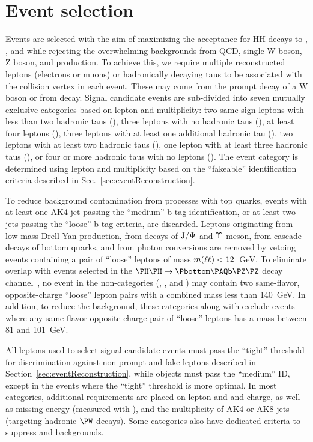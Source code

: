 \section{Event selection}
\label{sec:eventSelection}

Events are selected with the aim of maximizing the acceptance for HH decays to \WWWW, \WWtt, and
\tttt while rejecting the overwhelming backgrounds from QCD, single W
boson, Z boson, and \ttbar production.  To achieve this, we require multiple
reconstructed leptons \lep (electrons or muons) or hadronically decaying taus
\tauh to be associated with the collision vertex in each event.  These may come
from the prompt decay of a W boson or from \Pgt decay.  Signal candidate events
are sub-divided into seven mutually exclusive categories based on lepton and \tauh
multiplicity: two same-sign leptons with less than two hadronic taus (\llss),
three leptons with no hadronic taus (\lllnot), at least four leptons (\llll),
three leptons with at least one additional hadronic tau (\lllt), two
leptons with at least two hadronic taus (\lltt), one lepton with at least
three hadronic taus (\lttt), or four or more hadronic taus with no leptons (\noltttt).
The event category is determined using lepton and \tauh multiplicity based on the
``fakeable'' identification criteria described in Sec.~\ref{sec:eventReconstruction}.

To reduce background contamination from processes with top quarks, events with
at least one AK4 jet passing the ``medium'' b-tag identification, or at least two
jets passing the ``loose'' b-tag criteria, are discarded. 
Leptons originating from low-mass Drell-Yan production, from decays of $\textrm{J}/\Psi$ and $\Upsilon$ meson,
from cascade decays of bottom quarks, and from photon conversions
are removed by vetoing events containing a pair of ``loose'' leptons of mass $m(\ell\ell) < 12$~GeV.
To eliminate overlap with events selected in the $\HH \to \Pbottom\APbottom\PZ\PZ$ decay channel~\cite{HIG-20-004}, no event in the
non-\tauh categories (\llss, \lllnot, and \llll) may contain two same-flavor,
opposite-charge ``loose'' lepton pairs with a combined mass less than 140~GeV.
In addition, to reduce the \Zll background, these categories along with
\lltt exclude events where any same-flavor opposite-charge pair of ``loose''
leptons has a mass between 81 and 101~GeV.

All leptons used to select signal candidate events must pass the ``tight'' threshold
for discrimination against non-prompt and fake leptons described in
Section~\ref{sec:eventReconstruction}, while \tauh objects must pass the ``medium'' ID,
except in the \lllt events where the ``tight'' threshold is more optimal. 
In most categories, additional requirements are placed on lepton and \tauh \pt
and charge, as well as missing energy (measured with \metLD), and the multiplicity
of AK4 or AK8 jets (targeting hadronic $\PW$ decays).  Some categories also have dedicated
criteria to suppress \Zll and \Ztt backgrounds.

